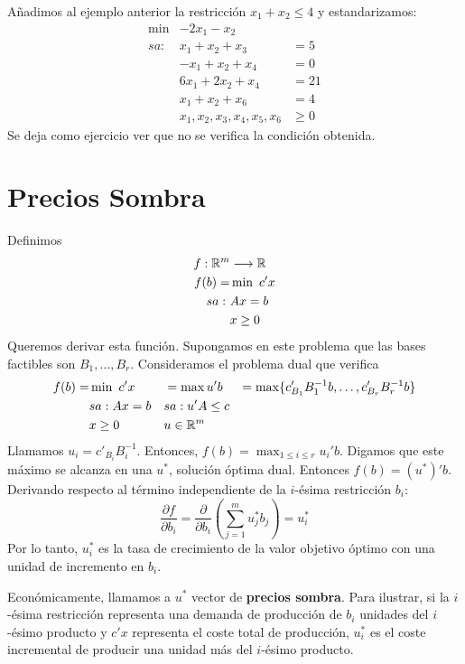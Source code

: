 \documentclass[PM.tex]{subfiles}
\begin{document}
\begin{example}
Añadimos al ejemplo anterior la restricción $x_1+x_2\leq 4$ y estandarizamos:
\[\begin{aligned}
\min & -2x_1-x_2 &\\
sa: & x_1+x_2 +x_3 &= 5\\
    & -x_1+x_2 +x_4 & =0\\
    & 6x_1+2x_2  +x_4 & = 21\\
    & x_1+x_2 +x_6  & = 4\\
    & x_1,x_2,x_3,x_4,x_5,x_6 & \geq 0
\end{aligned}\]
Se deja como ejercicio ver que no se verifica la condición obtenida.
\end{example}

\section{Precios Sombra}
Definimos 
\begin{align*}
f: \mathbb{R}^m& \longrightarrow \mathbb{R}\\
 f(b) = & \min\ c'x\\
  sa:\  & Ax=b\\
  & x\geq 0
\end{align*}
Queremos derivar esta función. Supongamos en este problema que las bases factibles son $B_1,\dots, B_r$. Consideramos el problema dual que verifica
\[\begin{aligned}
 f(b) = & \min\ c'x & & = \max u'b & = \max\{c'_{B_1}B_1^{-1}b,\dots, c'_{B_r}B_r^{-1}b\}\\
        & sa: Ax=b & & sa: u'A\leq c\\
        &  x\geq 0 & & u\in\mathbb{R}^m &
\end{aligned}\]
Llamamos $u_i=c'_{B_i}B_i^{-1}$. Entonces, $f(b)=\max_{1\leq i\leq r}u_i'b$. Digamos que este máximo se alcanza en una $u^*$, solución óptima dual.
Entonces $f(b)=(u^*)' b$. Derivando respecto al término independiente de la $i$-ésima restricción $b_i$:
\[\frac{\partial f}{\partial b_i}=\frac{\partial }{\partial b_i}\left(\sum_{j=1}^m u^*_jb_j\right)=u^*_i\]
Por lo tanto, $u^*_i$ es la tasa de crecimiento de la valor objetivo óptimo con una unidad de incremento en $b_i$.

Económicamente, llamamos a $u^*$ vector de \textbf{precios sombra}. Para ilustrar, si la $i$-ésima restricción representa una demanda de producción de $b_i$ unidades del $i$-ésimo producto y $c'x$ representa el coste total de producción, $u^*_i$ es el coste incremental de producir una unidad más del $i$-ésimo producto.
\end{document}
